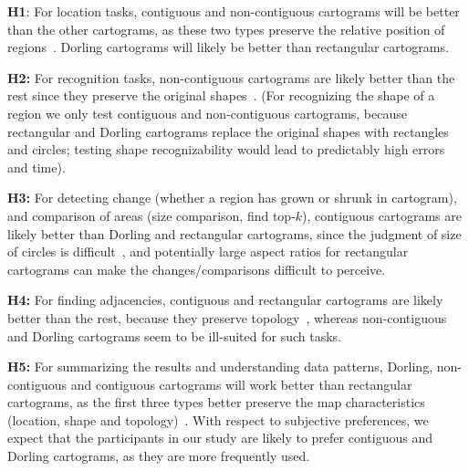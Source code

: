 \documentclass[10pt,journal,compsoc]{IEEEtran}
\begin{document}
{\bf  H1}: For location tasks, contiguous and non-contiguous cartograms will be better than the other cartograms, as these two types preserve the relative position of regions~\cite{AKV15, Olson, cartogram-star}. Dorling cartograms will likely be better than rectangular cartograms.


{\bf H2:} For recognition tasks, non-contiguous cartograms are likely better than the rest since they preserve the original shapes~\cite{Olson}. (For recognizing the shape of a region we only test contiguous and
non-contiguous cartograms, because rectangular and Dorling cartograms replace the original shapes with rectangles and circles; testing shape recognizability would lead to predictably high errors and time).

{\bf H3:} For detecting change (whether a region has grown or shrunk in cartogram), and comparison of areas (size comparison, find top-$k$), contiguous cartograms are likely better than Dorling and rectangular cartograms, since the judgment of size of circles is difficult~\cite{teghtsoonian1965judgment}, and potentially large aspect ratios for rectangular cartograms can make the changes/comparisons difficult to perceive.
 
{\bf H4:} For finding adjacencies, contiguous and rectangular cartograms are likely better than the rest, because they preserve topology~\cite{AKV15, cartogram-star}, whereas non-contiguous and Dorling cartograms seem to be ill-suited for such tasks.

{\bf H5:} For summarizing the results and understanding data patterns, Dorling, non-contiguous and contiguous cartograms will work better than rectangular cartograms, as the first three types better preserve the map characteristics (location, shape and topology)~\cite{AKV15}.
With respect to subjective preferences, we expect that the participants in our study are likely to prefer contiguous
 and Dorling cartograms, as they are more frequently used.
\end{document}
